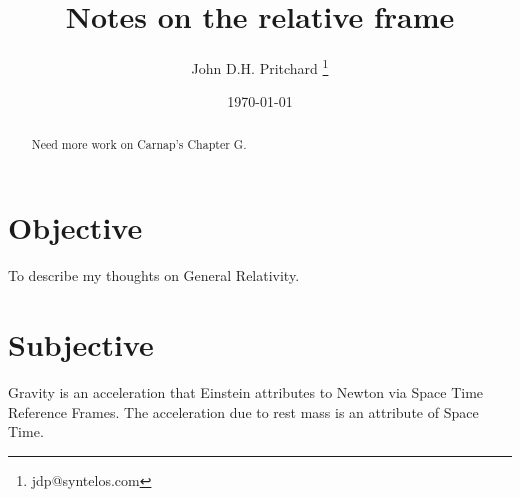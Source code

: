 \documentclass{article}
\begin{document}
\title{Notes on the relative frame}

\author{John D.H. Pritchard \thanks{jdp@syntelos.com}}

\date{\today}

\maketitle

\begin{abstract}
Need more work on Carnap's Chapter G.
\end{abstract}


\section{Objective}

To describe my thoughts on General Relativity. 

\section{Subjective}

Gravity is an acceleration that Einstein attributes to Newton via
Space Time Reference Frames.  The acceleration due to rest mass is an
attribute of Space Time.








\end{document}
